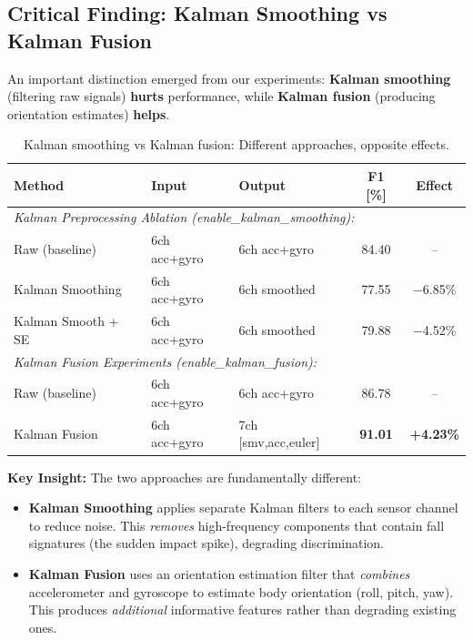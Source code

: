 \documentclass{article}
\begin{document}
\subsection{Critical Finding: Kalman Smoothing vs Kalman Fusion}

An important distinction emerged from our experiments: \textbf{Kalman smoothing} (filtering raw signals) \textbf{hurts} performance, while \textbf{Kalman fusion} (producing orientation estimates) \textbf{helps}.

\begin{table}[htbp]
    \centering
    \caption{Kalman smoothing vs Kalman fusion: Different approaches, opposite effects.}
    \label{tab:kalman_smoothing_vs_fusion}
    \small
    \begin{tabular}{lllcc}
        \toprule
        \textbf{Method} & \textbf{Input} & \textbf{Output} & \textbf{F1 [\%]} & \textbf{Effect} \\
        \midrule
        \multicolumn{5}{l}{\textit{Kalman Preprocessing Ablation (enable\_kalman\_smoothing):}} \\
        Raw (baseline) & 6ch acc+gyro & 6ch acc+gyro & 84.40 & -- \\
        Kalman Smoothing & 6ch acc+gyro & 6ch smoothed & 77.55 & $-$6.85\% \\
        Kalman Smooth + SE & 6ch acc+gyro & 6ch smoothed & 79.88 & $-$4.52\% \\
        \midrule
        \multicolumn{5}{l}{\textit{Kalman Fusion Experiments (enable\_kalman\_fusion):}} \\
        Raw (baseline) & 6ch acc+gyro & 6ch acc+gyro & 86.78 & -- \\
        Kalman Fusion & 6ch acc+gyro & 7ch [smv,acc,euler] & \textbf{91.01} & \textbf{+4.23\%} \\
        \bottomrule
    \end{tabular}
\end{table}

\textbf{Key Insight:} The two approaches are fundamentally different:
\begin{itemize}
    \item \textbf{Kalman Smoothing} applies separate Kalman filters to each sensor channel to reduce noise. This \textit{removes} high-frequency components that contain fall signatures (the sudden impact spike), degrading discrimination.

    \item \textbf{Kalman Fusion} uses an orientation estimation filter that \textit{combines} accelerometer and gyroscope to estimate body orientation (roll, pitch, yaw). This produces \textit{additional} informative features rather than degrading existing ones.
\end{itemize}
\end{document}
